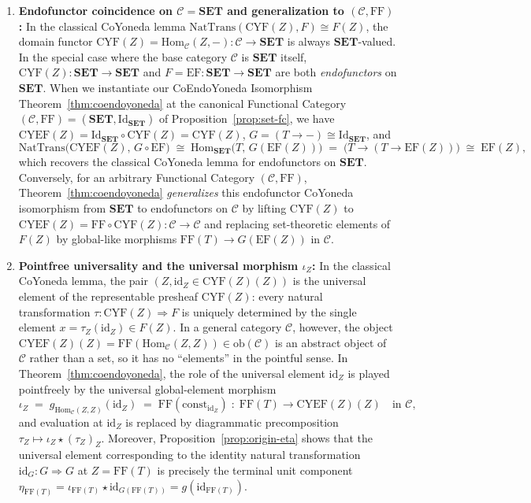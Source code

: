 \documentclass[11pt,a4paper]{article}
\theoremstyle{definition}
\theoremstyle{remark}
\newcommand{\Set}{\mathbf{SET}}
\newcommand{\Hom}{\mathrm{Hom}}
\newcommand{\NatTrans}{\mathrm{NatTrans}}
\newcommand{\Id}{\mathrm{Id}}
\newcommand{\id}{\mathrm{id}}
\newcommand{\CYF}{\mathrm{CYF}}
\newcommand{\CYEF}{\mathrm{CYEF}}
\newcommand{\FF}{\mathrm{FF}}
\newcommand{\EF}{\mathrm{EF}}
\newcommand{\const}{\mathrm{const}}
\newcommand{\iotaZ}{\iota_Z}
\begin{document}
\begin{enumerate}[label=(\arabic*),nosep]
  \item \textbf{Endofunctor coincidence on $\mathcal{C} = \Set$ and generalization to $(\mathcal{C}, \FF)$:}
  In the classical CoYoneda lemma $\NatTrans(\CYF(Z), F) \cong F(Z)$, the domain functor
  $\CYF(Z) = \Hom_{\mathcal{C}}(Z, -) : \mathcal{C} \to \Set$ is always $\Set$-valued. In the special
  case where the base category $\mathcal{C}$ is $\Set$ itself, $\CYF(Z) : \Set \to \Set$ and
  $F = \EF : \Set \to \Set$ are both \emph{endofunctors} on $\Set$. When we instantiate our
  CoEndoYoneda Isomorphism Theorem~\ref{thm:coendoyoneda} at the canonical Functional Category
  $(\mathcal{C}, \FF) = (\Set, \Id_{\Set})$ of Proposition~\ref{prop:set-fc}, we have
  $\CYEF(Z) = \Id_{\Set} \circ \CYF(Z) = \CYF(Z)$, $G = (T \to -) \cong \Id_{\Set}$, and
  \[
    \NatTrans\bigl(\CYEF(Z),\, G \circ \EF\bigr)
    \;\cong\;
    \Hom_{\Set}\bigl(T,\, G(\EF(Z))\bigr)
    \;=\;
    \bigl(T \to (T \to \EF(Z))\bigr)
    \;\cong\;
    \EF(Z),
  \]
  which recovers the classical CoYoneda lemma for endofunctors on $\Set$. Conversely, for an arbitrary
  Functional Category $(\mathcal{C}, \FF)$, Theorem~\ref{thm:coendoyoneda} \emph{generalizes} this
  endofunctor CoYoneda isomorphism from $\Set$ to endofunctors on $\mathcal{C}$ by lifting $\CYF(Z)$ to
  $\CYEF(Z) = \FF \circ \CYF(Z) : \mathcal{C} \to \mathcal{C}$ and replacing set-theoretic elements of
  $F(Z)$ by global-like morphisms $\FF(T) \to G(\EF(Z))$ in $\mathcal{C}$.

  \vspace{3pt}
  \item \textbf{Pointfree universality and the universal morphism $\iotaZ$:}
  In the classical CoYoneda lemma, the pair $(Z, \id_Z \in \CYF(Z)(Z))$ is the universal element of the
  representable presheaf $\CYF(Z)$: every natural transformation $\tau : \CYF(Z) \Rightarrow F$ is
  uniquely determined by the single element $x = \tau_Z(\id_Z) \in F(Z)$. In a general category
  $\mathcal{C}$, however, the object $\CYEF(Z)(Z) = \FF(\Hom_{\mathcal{C}}(Z, Z)) \in \mathrm{ob}(\mathcal{C})$
  is an abstract object of $\mathcal{C}$ rather than a set, so it has no ``elements'' in the pointful
  sense. In Theorem~\ref{thm:coendoyoneda}, the role of the universal element $\id_Z$ is played
  pointfreely by the universal global-element morphism
  \[
    \iotaZ \;=\; g_{\Hom_{\mathcal{C}}(Z, Z)}(\id_Z) \;=\; \FF(\const_{\id_Z})
    \;:\; \FF(T) \longrightarrow \CYEF(Z)(Z)
    \quad\text{in }\mathcal{C},
  \]
  and evaluation at $\id_Z$ is replaced by diagrammatic precomposition $\tau_Z \mapsto \iotaZ \star (\tau_Z)_Z$.
  Moreover, Proposition~\ref{prop:origin-eta} shows that the universal element corresponding to the
  identity natural transformation $\id_G : G \Rightarrow G$ at $Z = \FF(T)$ is precisely the terminal
  unit component $\eta_{\FF(T)} = \iota_{\FF(T)} \star \id_{G(\FF(T))} = g(\id_{\FF(T)})$.


\end{enumerate}
\end{document}
